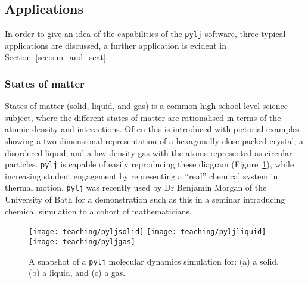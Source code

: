 \subsection{Applications}
In order to give an idea of the capabilities of the \texttt{pylj} software, three typical applications are discussed, a further application is evident in Section~\ref{sec:sim_and_scat}.

\subsubsection{States of matter}
States of matter (solid, liquid, and gas) is a common high school level science subject, where the different states of matter are rationalised in terms of the atomic density and interactions.
Often this is introduced with pictorial examples showing a two-dimensional representation of a hexagonally close-packed crystal, a disordered liquid, and a low-density gas with the atoms represented as circular particles.
\texttt{pylj} is capable of easily reproducing these diagram (Figure~\ref{fig:matter}), while increasing student engagement by representing a ``real'' chemical system in thermal motion.
\texttt{pylj} was recently used by Dr Benjamin Morgan of the University of Bath for a demonstration such as this in a seminar introducing chemical simulation to a cohort of mathematicians.
%
\begin{figure}
    \centering
    \texttt{[image: teaching/pyljsolid]}
    \texttt{[image: teaching/pyljliquid]}
    \texttt{[image: teaching/pyljgas]}
    \caption{A snapshot of a \texttt{pylj} molecular dynamics simulation for: (a) a solid, (b) a liquid, and (c) a gas.}
    \label{fig:matter}
\end{figure}
%

